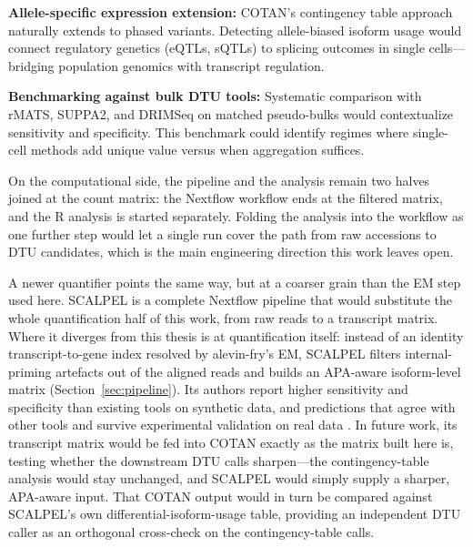 \textbf{Allele-specific expression extension:} COTAN's contingency table approach naturally extends to phased variants. Detecting allele-biased isoform usage would connect regulatory genetics (eQTLs, sQTLs) to splicing outcomes in single cells---bridging population genomics with transcript regulation.

\textbf{Benchmarking against bulk DTU tools:} Systematic comparison with rMATS, SUPPA2, and DRIMSeq \cite{love2018swimming, draper2025selecting} on matched pseudo-bulks would contextualize sensitivity and specificity. This benchmark could identify regimes where single-cell methods add unique value versus when aggregation suffices.

On the computational side, the pipeline and the analysis remain two halves joined at the count matrix: the Nextflow workflow ends at the filtered matrix, and the R analysis is started separately. Folding the analysis into the workflow as one further step would let a single run cover the path from raw accessions to DTU candidates, which is the main engineering direction this work leaves open.

A newer quantifier points the same way, but at a coarser grain than the EM step used here. SCALPEL\cite{ake2025scalpel} is a complete Nextflow pipeline that would substitute the whole quantification half of this work, from raw reads to a transcript matrix. Where it diverges from this thesis is at quantification itself: instead of an identity transcript-to-gene index resolved by alevin-fry's EM, SCALPEL filters internal-priming artefacts out of the aligned reads and builds an APA-aware isoform-level matrix (Section~\ref{sec:pipeline}). Its authors report higher sensitivity and specificity than existing tools on synthetic data, and predictions that agree with other tools and survive experimental validation on real data \cite{ake2025scalpel}. In future work, its transcript matrix would be fed into COTAN exactly as the matrix built here is, testing whether the downstream DTU calls sharpen---the contingency-table analysis would stay unchanged, and SCALPEL would simply supply a sharper, APA-aware input. That COTAN output would in turn be compared against SCALPEL's own differential-isoform-usage table, providing an independent DTU caller as an orthogonal cross-check on the contingency-table calls.

